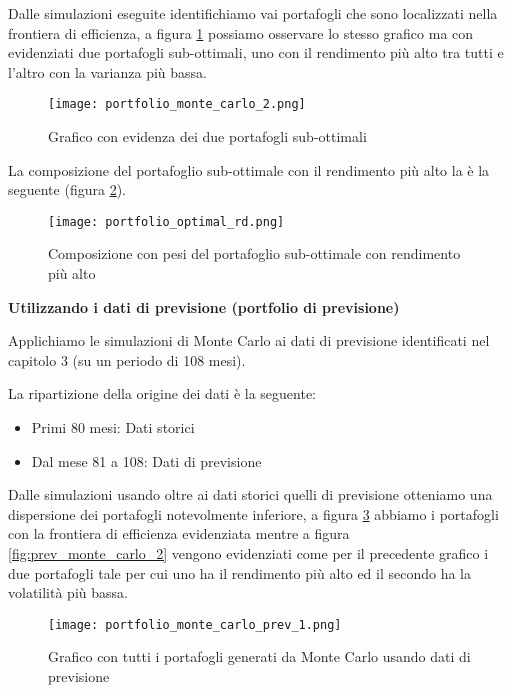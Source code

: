 \pagebreak

Dalle simulazioni eseguite identifichiamo vai portafogli che sono localizzati nella frontiera di efficienza, a figura \ref{fig:pf_monte_carlo_2} possiamo osservare
lo stesso grafico ma con evidenziati due portafogli sub-ottimali, uno con il rendimento più alto tra tutti e l'altro con la varianza più bassa.

\begin{figure}[ht]
    \centering
    \texttt{[image: portfolio\_monte\_carlo\_2.png]}
    \caption{Grafico con evidenza dei due portafogli sub-ottimali}
    \label{fig:pf_monte_carlo_2}
\end{figure}

La composizione del portafoglio sub-ottimale con il rendimento più alto la è la seguente (figura \ref{fig:pf_optimal_rd}).

\begin{figure}[ht]
    \centering
    \texttt{[image: portfolio\_optimal\_rd.png]}
    \caption{Composizione con pesi del portafoglio sub-ottimale con rendimento più alto}
    \label{fig:pf_optimal_rd}
\end{figure}

\textbf{Utilizzando i dati di previsione (portfolio di previsione)}

Applichiamo le simulazioni di Monte Carlo ai dati di previsione identificati nel capitolo 3 (su un periodo di 108 mesi).

La ripartizione della origine dei dati è la seguente:
\begin{itemize}
    \item Primi 80 mesi: Dati storici
    \item Dal mese 81 a 108: Dati di previsione
\end{itemize}

Dalle simulazioni usando oltre ai dati storici quelli di previsione otteniamo una dispersione dei portafogli notevolmente inferiore, a figura \ref{fig:prev_monte_carlo_1}
abbiamo i portafogli con la frontiera di efficienza evidenziata mentre a figura \ref{fig:prev_monte_carlo_2} vengono evidenziati come per il precedente grafico i due portafogli tale
per cui uno ha il rendimento più alto ed il secondo ha la volatilità più bassa.

\begin{figure}[p]
    \centering
    \texttt{[image: portfolio\_monte\_carlo\_prev\_1.png]}
    \caption{Grafico con tutti i portafogli generati da Monte Carlo usando dati di previsione}
    \label{fig:prev_monte_carlo_1}
\end{figure}

